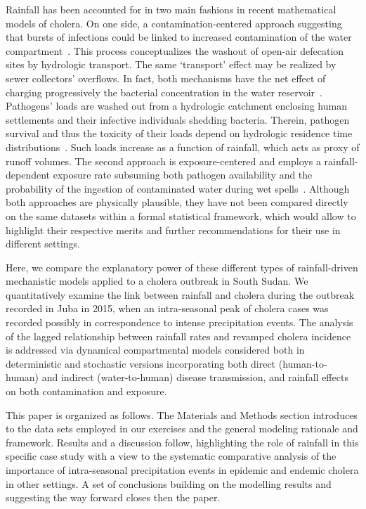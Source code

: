 Rainfall has been accounted for in two main fashions in recent mathematical models of cholera. On one side, a contamination-centered approach suggesting that bursts of infections could be linked to increased contamination of the water compartment~\cite{rinaldoReassessment201020112012}. This process conceptualizes the washout of open-air defecation sites by hydrologic transport. The same `transport' effect may be realized by sewer collectors' overflows. In fact, both mechanisms have the net effect of charging progressively the bacterial concentration in the water reservoir~\cite{codeco01}. Pathogens' loads are washed out from a hydrologic catchment enclosing human settlements and their infective individuals shedding bacteria. Therein, pathogen survival and thus the toxicity of their loads depend on hydrologic residence time distributions~\cite{rinaldoReassessment201020112012,rinaldoModelingKeyDrivers2017}. Such loads increase as a function of rainfall, which acts as proxy of runoff volumes. The second approach is exposure-centered and employs a rainfall-dependent exposure rate subsuming both pathogen availability and the probability of the ingestion of contaminated water during wet spells~\cite{eisenbergExaminingRainfallCholera2013}. Although both approaches are physically plausible, they have not been compared directly on the same datasets within a formal statistical framework, which would allow to highlight their respective merits and further recommendations for their use in different settings.


Here, we compare the explanatory power of these different types of rainfall-driven mechanistic models applied to a cholera outbreak in South Sudan. We quantitatively examine the link between rainfall and cholera during the outbreak recorded in Juba in 2015, when an intra-seasonal peak of cholera cases was recorded possibly in correspondence to intense precipitation events. The analysis of the lagged relationship between rainfall rates and revamped cholera incidence is addressed via dynamical compartmental models considered both in deterministic and stochastic versions incorporating both direct (human-to-human) and indirect (water-to-human) disease transmission, and rainfall effects on both contamination and exposure.

This paper is organized as follows. The Materials and Methods section introduces to the data sets employed in our exercises and the general modeling rationale and framework. Results and a discussion follow, highlighting the role of rainfall in this specific case study with a view to the systematic comparative analysis of the importance of intra-seasonal precipitation events in epidemic and endemic cholera in other settings. A set of conclusions building on the modelling results and suggesting the way forward closes then the paper. 

